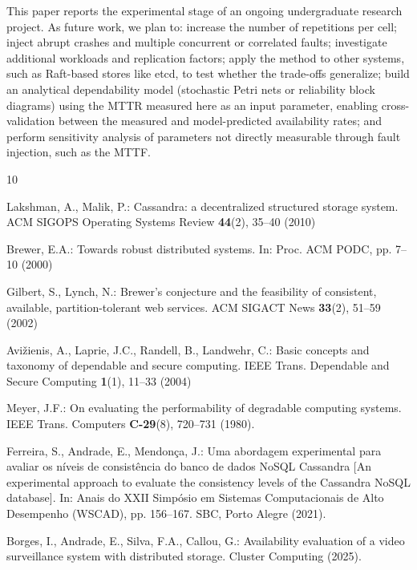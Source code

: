 \documentclass[runningheads]{llncs}
\begin{document}
This paper reports the experimental stage of an ongoing undergraduate research
project. As future work, we plan to: increase the number of repetitions per
cell; inject abrupt crashes and multiple concurrent or correlated faults;
investigate additional workloads and replication factors; apply the method to
other systems, such as Raft-based stores like etcd, to test whether the
trade-offs generalize; build an analytical
dependability model (stochastic Petri nets or reliability block diagrams) using
the MTTR measured here as an input parameter, enabling cross-validation between
the measured and model-predicted availability rates; and perform sensitivity
analysis of parameters not directly measurable through fault injection, such as
the MTTF.

\begin{thebibliography}{10}

Lakshman, A., Malik, P.: Cassandra: a decentralized structured storage system.
ACM SIGOPS Operating Systems Review \textbf{44}(2), 35--40 (2010)

Brewer, E.A.: Towards robust distributed systems. In: Proc. ACM PODC, pp. 7--10
(2000)

Gilbert, S., Lynch, N.: Brewer's conjecture and the feasibility of consistent,
available, partition-tolerant web services. ACM SIGACT News \textbf{33}(2),
51--59 (2002)

Avi\v{z}ienis, A., Laprie, J.C., Randell, B., Landwehr, C.: Basic concepts and
taxonomy of dependable and secure computing. IEEE Trans. Dependable and Secure
Computing \textbf{1}(1), 11--33 (2004)

Meyer, J.F.: On evaluating the performability of degradable computing systems.
IEEE Trans. Computers \textbf{C-29}(8), 720--731 (1980).

Ferreira, S., Andrade, E., Mendonça, J.: Uma abordagem experimental para
avaliar os níveis de consistência do banco de dados NoSQL Cassandra [An
experimental approach to evaluate the consistency levels of the Cassandra NoSQL
database]. In: Anais do XXII Simpósio em Sistemas Computacionais de Alto
Desempenho (WSCAD), pp. 156--167. SBC, Porto Alegre (2021).

Borges, I., Andrade, E., Silva, F.A., Callou, G.: Availability evaluation of a
video surveillance system with distributed storage. Cluster Computing (2025).


\end{thebibliography}
\end{document}
